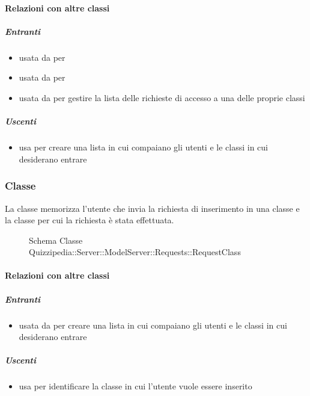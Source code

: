 \paragraph{Relazioni con altre classi}
\subparagraph{Entranti}
\begin{itemize}
\item usata da  per 
\item usata da  per 
\item usata da  per gestire la lista delle richieste di accesso a una delle proprie classi
\end{itemize}
\subparagraph{Uscenti}
\begin{itemize}
\item usa  per creare una lista in cui compaiano gli utenti e le classi in cui desiderano entrare
\end{itemize}
\subsubsection{Classe }
La classe memorizza l'utente che invia la richiesta di inserimento in una classe e la classe per cui la richiesta è stata effettuata.
\begin{figure}[H]
\centering
\noindent{}
\caption[Schema Classe RequestClass]{Schema Classe Quizzipedia::Server::ModelServer::Requests::RequestClass}
\end{figure}
\paragraph{Relazioni con altre classi}
\subparagraph{Entranti}
\begin{itemize}
\item usata da  per creare una lista in cui compaiano gli utenti e le classi in cui desiderano entrare
\end{itemize}
\subparagraph{Uscenti}
\begin{itemize}
\item usa  per identificare la classe
in cui l'utente vuole essere inserito
\end{itemize}
